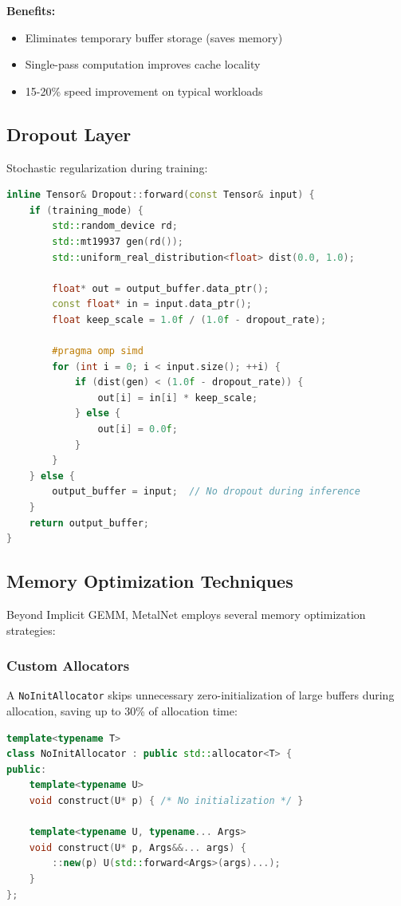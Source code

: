 \documentclass[12pt,oneside,a4paper]{report}
\begin{document}
\textbf{Benefits:}
\begin{itemize}
    \item Eliminates temporary buffer storage (saves memory)
    \item Single-pass computation improves cache locality
    \item 15-20\% speed improvement on typical workloads
\end{itemize}

\subsection{Dropout Layer}

Stochastic regularization during training:

\begin{lstlisting}[language=C++]
inline Tensor& Dropout::forward(const Tensor& input) {
    if (training_mode) {
        std::random_device rd;
        std::mt19937 gen(rd());
        std::uniform_real_distribution<float> dist(0.0, 1.0);

        float* out = output_buffer.data_ptr();
        const float* in = input.data_ptr();
        float keep_scale = 1.0f / (1.0f - dropout_rate);

        #pragma omp simd
        for (int i = 0; i < input.size(); ++i) {
            if (dist(gen) < (1.0f - dropout_rate)) {
                out[i] = in[i] * keep_scale;
            } else {
                out[i] = 0.0f;
            }
        }
    } else {
        output_buffer = input;  // No dropout during inference
    }
    return output_buffer;
}
\end{lstlisting}

\subsection{Memory Optimization Techniques}

Beyond Implicit GEMM, MetalNet employs several memory optimization strategies:

\subsubsection{Custom Allocators}

A \texttt{NoInitAllocator} skips unnecessary zero-initialization of large buffers during allocation, saving up to 30\% of allocation time:

\begin{lstlisting}[language=C++]
template<typename T>
class NoInitAllocator : public std::allocator<T> {
public:
    template<typename U>
    void construct(U* p) { /* No initialization */ }

    template<typename U, typename... Args>
    void construct(U* p, Args&&... args) {
        ::new(p) U(std::forward<Args>(args)...);
    }
};
\end{lstlisting}
\end{document}
